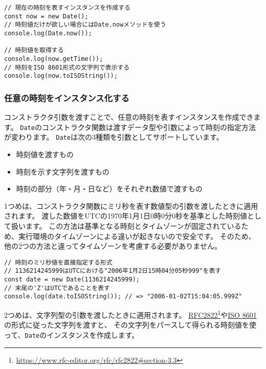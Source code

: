 \begin{lstlisting}
// 現在の時刻を表すインスタンスを作成する
const now = new Date();
// 時刻値だけが欲しい場合にはDate.nowメソッドを使う
console.log(Date.now());

// 時刻値を取得する
console.log(now.getTime());
// 時刻をISO 8601形式の文字列で表示する
console.log(now.toISOString());
\end{lstlisting}

\hypertarget{instance-any-time}{%
\subsubsection{任意の時刻をインスタンス化する}\label{instance-any-time}}

コンストラクタ引数を渡すことで、任意の時刻を表すインスタンスを作成できます。
\texttt{Date}のコンストラクタ関数は渡すデータ型や引数によって時刻の指定方法が変わります。
\texttt{Date}は次の3種類を引数としてサポートしています。

\begin{itemize}
\item
  時刻値を渡すもの
\item
  時刻を示す文字列を渡すもの
\item
  時刻の部分（年・月・日など）をそれぞれ数値で渡すもの
\end{itemize}

1つめは、コンストラクタ関数にミリ秒を表す数値型の引数を渡したときに適用されます。
渡した数値をUTCの1970年1月1日0時0分0秒を基準とした時刻値として扱います。
この方法は基準となる時刻とタイムゾーンが固定されているため、実行環境のタイムゾーンによる違いが起きないので安全です。
そのため、他の2つの方法と違ってタイムゾーンを考慮する必要がありません。

\begin{lstlisting}
// 時刻のミリ秒値を直接指定する形式
// 1136214245999はUTCにおける"2006年1月2日15時04分05秒999"を表す
const date = new Date(1136214245999);
// 末尾の'Z'はUTCであることを表す
console.log(date.toISOString()); // => "2006-01-02T15:04:05.999Z"
\end{lstlisting}

2つめは、文字列型の引数を渡したときに適用されます。
\href{https://www.rfc-editor.org/rfc/rfc2822\#section-3.3}{RFC2822}\footnote{\url{https://www.rfc-editor.org/rfc/rfc2822\#section-3.3}}や\href{https://ja.wikipedia.org/wiki/ISO_8601}{ISO
8601}の形式に従った文字列を渡すと、
その文字列をパースして得られる時刻値を使って、\texttt{Date}のインスタンスを作成します。

